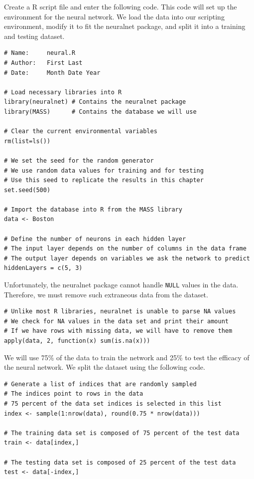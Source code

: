 Create a R script file and enter the following code.
This code will set up the environment for the neural network.
We load the data into our scripting environment, modify it to fit the neuralnet package, and split it into a training and testing dataset. 
\begin{lstlisting}
# Name:     neural.R
# Author:   First Last
# Date:     Month Date Year

# Load necessary libraries into R
library(neuralnet) # Contains the neuralnet package
library(MASS)      # Contains the database we will use

# Clear the current environmental variables
rm(list=ls())

# We set the seed for the random generator
# We use random data values for training and for testing
# Use this seed to replicate the results in this chapter
set.seed(500)

# Import the database into R from the MASS library
data <- Boston

# Define the number of neurons in each hidden layer
# The input layer depends on the number of columns in the data frame
# The output layer depends on variables we ask the network to predict
hiddenLayers = c(5, 3)
\end{lstlisting}

Unfortunately, the neuralnet package cannot handle \texttt{NULL} values in the data.
Therefore, we must remove such extraneous data from the dataset.

\begin{lstlisting}
# Unlike most R libraries, neuralnet is unable to parse NA values
# We check for NA values in the data set and print their amount
# If we have rows with missing data, we will have to remove them
apply(data, 2, function(x) sum(is.na(x)))
\end{lstlisting}

We will use 75\% of the data to train the network and 25\% to test the efficacy of the neural network.
We split the dataset using the following code.

\begin{lstlisting}
# Generate a list of indices that are randomly sampled
# The indices point to rows in the data
# 75 percent of the data set indices is selected in this list
index <- sample(1:nrow(data), round(0.75 * nrow(data)))

# The training data set is composed of 75 percent of the test data
train <- data[index,]

# The testing data set is composed of 25 percent of the test data
test <- data[-index,]
\end{lstlisting}

